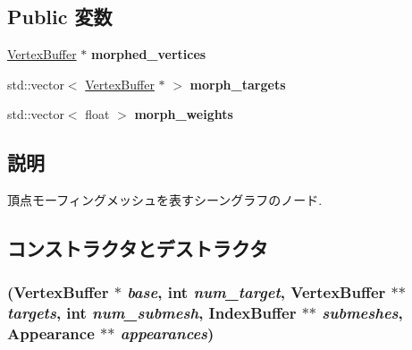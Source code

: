 \subsection*{Public 変数}
\begin{CompactItemize}
\item 
\hypertarget{classm3g_1_1MorphingMesh_76c5d624bf40e238c8b3a1fdeb9097ea}{
\hyperlink{classm3g_1_1VertexBuffer}{VertexBuffer} $\ast$ \textbf{morphed\_\-vertices}}
\label{classm3g_1_1MorphingMesh_76c5d624bf40e238c8b3a1fdeb9097ea}

\item 
\hypertarget{classm3g_1_1MorphingMesh_b24428696ee82ba6062934a0f21501dd}{
std::vector$<$ \hyperlink{classm3g_1_1VertexBuffer}{VertexBuffer} $\ast$ $>$ \textbf{morph\_\-targets}}
\label{classm3g_1_1MorphingMesh_b24428696ee82ba6062934a0f21501dd}

\item 
\hypertarget{classm3g_1_1MorphingMesh_712adba14558405c12e3162083164c7e}{
std::vector$<$ float $>$ \textbf{morph\_\-weights}}
\label{classm3g_1_1MorphingMesh_712adba14558405c12e3162083164c7e}

\end{CompactItemize}


\subsection{説明}
頂点モーフィングメッシュを表すシーングラフのノード. 

\subsection{コンストラクタとデストラクタ}
\hypertarget{classm3g_1_1MorphingMesh_211192cdba0b1d136977403ba4ed0d0c}{
\subsubsection[{MorphingMesh}]{ ({\bf VertexBuffer} $\ast$ {\em base}, \/  int {\em num\_\-target}, \/  {\bf VertexBuffer} $\ast$$\ast$ {\em targets}, \/  int {\em num\_\-submesh}, \/  {\bf IndexBuffer} $\ast$$\ast$ {\em submeshes}, \/  {\bf Appearance} $\ast$$\ast$ {\em appearances})}}
\label{classm3g_1_1MorphingMesh_211192cdba0b1d136977403ba4ed0d0c}


